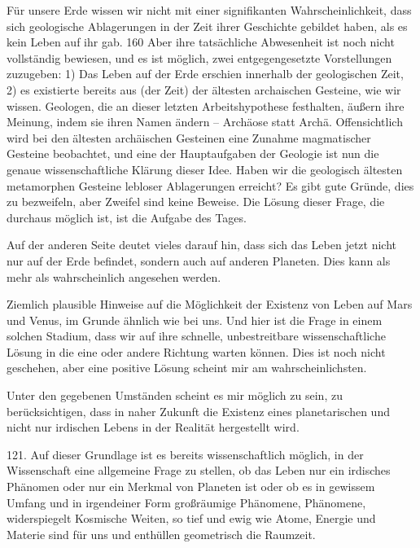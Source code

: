 \documentclass[11pt,a4paper]{book}
\begin{document}
Für unsere Erde wissen wir nicht mit einer signifikanten Wahrscheinlichkeit, dass sich geologische Ablagerungen in der Zeit ihrer Geschichte gebildet haben, als es kein Leben auf ihr gab. 160 Aber ihre tatsächliche Abwesenheit ist noch nicht vollständig bewiesen, und es ist möglich, zwei entgegengesetzte Vorstellungen zuzugeben: 1) Das Leben auf der Erde erschien innerhalb der geologischen Zeit, 2) es existierte bereits aus (der Zeit) der ältesten archaischen Gesteine, wie wir wissen. Geologen, die an dieser letzten Arbeitshypothese festhalten, äußern ihre Meinung, indem sie ihren Namen ändern -- Archäose statt Archä. Offensichtlich wird bei den ältesten archäischen Gesteinen eine Zunahme magmatischer Gesteine beobachtet, und eine der Hauptaufgaben der Geologie ist nun die genaue wissenschaftliche Klärung dieser Idee. Haben wir die geologisch ältesten metamorphen Gesteine lebloser Ablagerungen erreicht? Es gibt gute Gründe, dies zu bezweifeln, aber Zweifel sind keine Beweise. Die Lösung dieser Frage, die durchaus möglich ist, ist die Aufgabe des Tages.



Auf der anderen Seite deutet vieles darauf hin, dass sich das Leben jetzt nicht nur auf der Erde befindet, sondern auch auf anderen Planeten. Dies kann als mehr als wahrscheinlich angesehen werden.



Ziemlich plausible Hinweise auf die Möglichkeit der Existenz von Leben auf Mars und Venus, im Grunde ähnlich wie bei uns. Und hier ist die Frage in einem solchen Stadium, dass wir auf ihre schnelle, unbestreitbare wissenschaftliche Lösung in die eine oder andere Richtung warten können. Dies ist noch nicht geschehen, aber eine positive Lösung scheint mir am wahrscheinlichsten.



Unter den gegebenen Umständen scheint es mir möglich zu sein, zu berücksichtigen, dass in naher Zukunft die Existenz eines planetarischen und nicht nur irdischen Lebens in der Realität hergestellt wird.



121. Auf dieser Grundlage ist es bereits wissenschaftlich möglich, in der Wissenschaft eine allgemeine Frage zu stellen, ob das Leben nur ein irdisches Phänomen oder nur ein Merkmal von Planeten ist oder ob es in gewissem Umfang und in irgendeiner Form großräumige Phänomene, Phänomene, widerspiegelt Kosmische Weiten, so tief und ewig wie Atome, Energie und Materie sind für uns und enthüllen geometrisch die Raumzeit.
\end{document}
